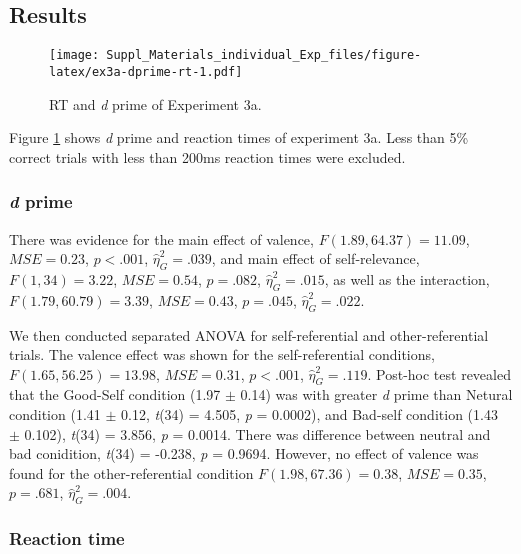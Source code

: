 \documentclass[
  english,
  man]{apa6}
\begin{document}
\hypertarget{results-4}{%
\subsection{Results}\label{results-4}}

\begin{figure}
\centering
\texttt{[image: Suppl\_Materials\_individual\_Exp\_files/figure-latex/ex3a-dprime-rt-1.pdf]}
\caption{\label{fig:ex3a-dprime-rt}RT and \emph{d} prime of Experiment 3a.}
\end{figure}

Figure \ref{fig:ex3a-dprime-rt} shows \emph{d} prime and reaction times of experiment 3a. Less than 5\% correct trials with less than 200ms reaction times were excluded.

\hypertarget{d-prime-2}{%
\subsubsection{\texorpdfstring{\emph{d} prime}{d prime}}\label{d-prime-2}}

There was evidence for the main effect of valence, \(F(1.89, 64.37) = 11.09\), \(\mathit{MSE} = 0.23\), \(p < .001\), \(\hat{\eta}^2_G = .039\), and main effect of self-relevance, \(F(1, 34) = 3.22\), \(\mathit{MSE} = 0.54\), \(p = .082\), \(\hat{\eta}^2_G = .015\), as well as the interaction, \(F(1.79, 60.79) = 3.39\), \(\mathit{MSE} = 0.43\), \(p = .045\), \(\hat{\eta}^2_G = .022\).

We then conducted separated ANOVA for self-referential and other-referential trials. The valence effect was shown for the self-referential conditions, \(F(1.65, 56.25) = 13.98\), \(\mathit{MSE} = 0.31\), \(p < .001\), \(\hat{\eta}^2_G = .119\). Post-hoc test revealed that the Good-Self condition (1.97 \(\pm\) 0.14) was with greater \emph{d} prime than Netural condition (1.41 \(\pm\) 0.12, \emph{t}(34) = 4.505, \emph{p} = 0.0002), and Bad-self condition (1.43 \(\pm\) 0.102), \emph{t}(34) = 3.856, \emph{p} = 0.0014. There was difference between neutral and bad conidition, \emph{t}(34) = -0.238, \emph{p} = 0.9694. However, no effect of valence was found for the other-referential condition \(F(1.98, 67.36) = 0.38\), \(\mathit{MSE} = 0.35\), \(p = .681\), \(\hat{\eta}^2_G = .004\).

\hypertarget{reaction-time-3}{%
\subsubsection{Reaction time}\label{reaction-time-3}}
\end{document}
